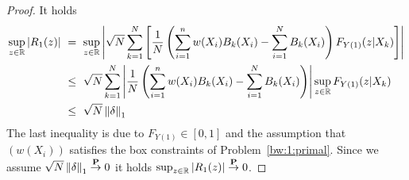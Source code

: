 \begin{proof}
It holds
  \begin{align}
    \label{R_1:1}
    \begin{split}
    \sup_{z\in\R}
    \left| 
    R_1(z)
    \right|
    &
    \ 
    =
    \ 
    \sup_{z\in\R}
    \left| 
  \sqrt{N}
  \sum_{k=1}^{N} 
  \left[ 
  \frac{1}{N}
  \left( 
    \sum_{i=1}^{n} 
    w(X_i)
    B_k(X_i)
    -
    \sum_{i=1}^{N} 
    B_k(X_i)
  \right)
  F_{Y(1)}(z|X_k)
  \right]
    \right|
    \\
    &
    \ 
    \le
    \ 
  \sqrt{N}
  \sum_{k=1}^{N} 
  \left| 
  \frac{1}{N}
  \left( 
    \sum_{i=1}^{n} 
    w(X_i)
    B_k(X_i)
    -
    \sum_{i=1}^{N} 
    B_k(X_i)
  \right)
  \right|
    \sup_{z\in\R}
  F_{Y(1)}(z|X_k)
  \\
    &
    \ 
    \le
    \ 
  \sqrt{N}
  \norm{\delta}_1
    \end{split}
  \end{align}
  The last inequality is due to $F_{Y(1)}\in[0,1]$ and the assumption that $(w(X_i))$ satisfies the box constraints of Problem~\ref{bw:1:primal}.
  Since we assume 
$\sqrt{N}\left\lVert\delta\right\rVert_1\overset{\mathbf{P}}{\to}0$
it holds
$\sup_{z\in\mathbb{R}}|R_1(z)|\overset{\mathbf{P}}{\to}0$.
\end{proof}
